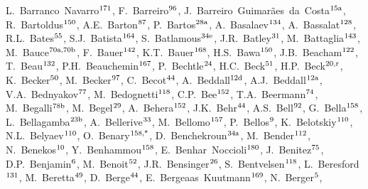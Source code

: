 \begin{flushleft}
L.~Barranco~Navarro$^\textrm{\scriptsize 171}$,    
F.~Barreiro$^\textrm{\scriptsize 96}$,    
J.~Barreiro~Guimar\~{a}es~da~Costa$^\textrm{\scriptsize 15a}$,    
R.~Bartoldus$^\textrm{\scriptsize 150}$,    
A.E.~Barton$^\textrm{\scriptsize 87}$,    
P.~Bartos$^\textrm{\scriptsize 28a}$,    
A.~Basalaev$^\textrm{\scriptsize 134}$,    
A.~Bassalat$^\textrm{\scriptsize 128}$,    
R.L.~Bates$^\textrm{\scriptsize 55}$,    
S.J.~Batista$^\textrm{\scriptsize 164}$,    
S.~Batlamous$^\textrm{\scriptsize 34e}$,    
J.R.~Batley$^\textrm{\scriptsize 31}$,    
M.~Battaglia$^\textrm{\scriptsize 143}$,    
M.~Bauce$^\textrm{\scriptsize 70a,70b}$,    
F.~Bauer$^\textrm{\scriptsize 142}$,    
K.T.~Bauer$^\textrm{\scriptsize 168}$,    
H.S.~Bawa$^\textrm{\scriptsize 150}$,    
J.B.~Beacham$^\textrm{\scriptsize 122}$,    
T.~Beau$^\textrm{\scriptsize 132}$,    
P.H.~Beauchemin$^\textrm{\scriptsize 167}$,    
P.~Bechtle$^\textrm{\scriptsize 24}$,    
H.C.~Beck$^\textrm{\scriptsize 51}$,    
H.P.~Beck$^\textrm{\scriptsize 20,r}$,    
K.~Becker$^\textrm{\scriptsize 50}$,    
M.~Becker$^\textrm{\scriptsize 97}$,    
C.~Becot$^\textrm{\scriptsize 44}$,    
A.~Beddall$^\textrm{\scriptsize 12d}$,    
A.J.~Beddall$^\textrm{\scriptsize 12a}$,    
V.A.~Bednyakov$^\textrm{\scriptsize 77}$,    
M.~Bedognetti$^\textrm{\scriptsize 118}$,    
C.P.~Bee$^\textrm{\scriptsize 152}$,    
T.A.~Beermann$^\textrm{\scriptsize 74}$,    
M.~Begalli$^\textrm{\scriptsize 78b}$,    
M.~Begel$^\textrm{\scriptsize 29}$,    
A.~Behera$^\textrm{\scriptsize 152}$,    
J.K.~Behr$^\textrm{\scriptsize 44}$,    
A.S.~Bell$^\textrm{\scriptsize 92}$,    
G.~Bella$^\textrm{\scriptsize 158}$,    
L.~Bellagamba$^\textrm{\scriptsize 23b}$,    
A.~Bellerive$^\textrm{\scriptsize 33}$,    
M.~Bellomo$^\textrm{\scriptsize 157}$,    
P.~Bellos$^\textrm{\scriptsize 9}$,    
K.~Belotskiy$^\textrm{\scriptsize 110}$,    
N.L.~Belyaev$^\textrm{\scriptsize 110}$,    
O.~Benary$^\textrm{\scriptsize 158,*}$,    
D.~Benchekroun$^\textrm{\scriptsize 34a}$,    
M.~Bender$^\textrm{\scriptsize 112}$,    
N.~Benekos$^\textrm{\scriptsize 10}$,    
Y.~Benhammou$^\textrm{\scriptsize 158}$,    
E.~Benhar~Noccioli$^\textrm{\scriptsize 180}$,    
J.~Benitez$^\textrm{\scriptsize 75}$,    
D.P.~Benjamin$^\textrm{\scriptsize 6}$,    
M.~Benoit$^\textrm{\scriptsize 52}$,    
J.R.~Bensinger$^\textrm{\scriptsize 26}$,    
S.~Bentvelsen$^\textrm{\scriptsize 118}$,    
L.~Beresford$^\textrm{\scriptsize 131}$,    
M.~Beretta$^\textrm{\scriptsize 49}$,    
D.~Berge$^\textrm{\scriptsize 44}$,    
E.~Bergeaas~Kuutmann$^\textrm{\scriptsize 169}$,    
N.~Berger$^\textrm{\scriptsize 5}$,    

\end{flushleft}
